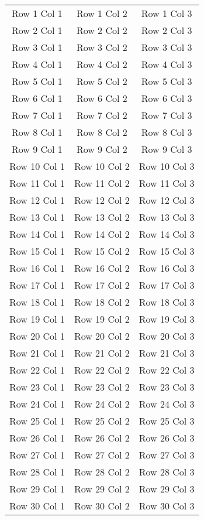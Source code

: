 \begin{longtable}{ccc}
    Row 1 Col 1 & Row 1 Col 2 & Row 1 Col 3 \\
    Row 2 Col 1 & Row 2 Col 2 & Row 2 Col 3 \\
    Row 3 Col 1 & Row 3 Col 2 & Row 3 Col 3 \\
    Row 4 Col 1 & Row 4 Col 2 & Row 4 Col 3 \\
    Row 5 Col 1 & Row 5 Col 2 & Row 5 Col 3 \\
    Row 6 Col 1 & Row 6 Col 2 & Row 6 Col 3 \\
    Row 7 Col 1 & Row 7 Col 2 & Row 7 Col 3 \\
    Row 8 Col 1 & Row 8 Col 2 & Row 8 Col 3 \\
    Row 9 Col 1 & Row 9 Col 2 & Row 9 Col 3 \\
    Row 10 Col 1 & Row 10 Col 2 & Row 10 Col 3 \\
    Row 11 Col 1 & Row 11 Col 2 & Row 11 Col 3 \\
    Row 12 Col 1 & Row 12 Col 2 & Row 12 Col 3 \\
    Row 13 Col 1 & Row 13 Col 2 & Row 13 Col 3 \\
    Row 14 Col 1 & Row 14 Col 2 & Row 14 Col 3 \\
    Row 15 Col 1 & Row 15 Col 2 & Row 15 Col 3 \\
    Row 16 Col 1 & Row 16 Col 2 & Row 16 Col 3 \\
    Row 17 Col 1 & Row 17 Col 2 & Row 17 Col 3 \\
    Row 18 Col 1 & Row 18 Col 2 & Row 18 Col 3 \\
    Row 19 Col 1 & Row 19 Col 2 & Row 19 Col 3 \\
    Row 20 Col 1 & Row 20 Col 2 & Row 20 Col 3 \\
    Row 21 Col 1 & Row 21 Col 2 & Row 21 Col 3 \\
    Row 22 Col 1 & Row 22 Col 2 & Row 22 Col 3 \\
    Row 23 Col 1 & Row 23 Col 2 & Row 23 Col 3 \\
    Row 24 Col 1 & Row 24 Col 2 & Row 24 Col 3 \\
    Row 25 Col 1 & Row 25 Col 2 & Row 25 Col 3 \\
    Row 26 Col 1 & Row 26 Col 2 & Row 26 Col 3 \\
    Row 27 Col 1 & Row 27 Col 2 & Row 27 Col 3 \\
    Row 28 Col 1 & Row 28 Col 2 & Row 28 Col 3 \\
    Row 29 Col 1 & Row 29 Col 2 & Row 29 Col 3 \\
    Row 30 Col 1 & Row 30 Col 2 & Row 30 Col 3 \\
\end{longtable}


